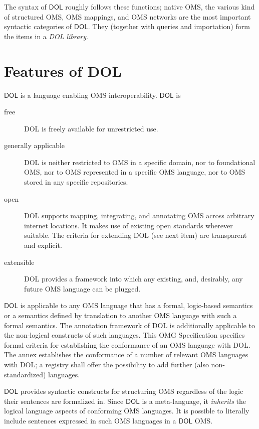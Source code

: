 \documentclass[10pt,fleqn,%
\ifpretendfinal
final%
\else
draft%
\fi,
]{scrreprt}
\newcommand*{\IS}{OMG Specification\xspace}
\newcommand*{\DOL}{\ensuremath{\mathsf{DOL}}\xspace}
\begin{document}
The syntax of \DOL roughly follows these functions; native OMS, the various kind of structured OMS, OMS mappings, and OMS networks are the most important syntactic categories of \DOL. 
They (together with queries and importation) form the items in a \emph{DOL library}.
 





\section{Features of DOL}\label{c:req:overview}

\DOL is a language enabling OMS interoperability. 
\DOL is
\begin{description}
\item[free] DOL is freely available for unrestricted use.
\item[generally applicable] DOL is neither restricted to OMS in a specific domain, nor to foundational OMS, nor to OMS represented in a specific OMS language, nor to OMS stored in any specific repositories.
\item[open] DOL supports mapping, integrating, and annotating OMS across arbitrary internet locations.  It makes use of existing open standards wherever suitable.  The criteria for extending DOL (see next item) are transparent and explicit.
\item[extensible] DOL provides a framework into which any existing, and, desirably, any future OMS language can be plugged.
\end{description}
\DOL is applicable to any OMS language that has a formal, logic-based semantics or a semantics defined by translation to another OMS language with such a formal semantics. The annotation framework of DOL is additionally applicable to the non-logical constructs of such languages. This \IS specifies formal criteria for establishing the conformance of an OMS language with DOL.  The annex establishes the conformance of a number of relevant OMS languages with DOL; a registry shall offer the possibility to add further (also non-standardized) languages. 

\DOL provides syntactic constructs for structuring OMS regardless of the logic their sentences are formalized in. 
Since \DOL is a meta-language,  it \textit{inherits} the logical language aspects of conforming OMS languages.  It is possible to literally include sentences expressed in such OMS languages in a \DOL OMS.
\end{document}
